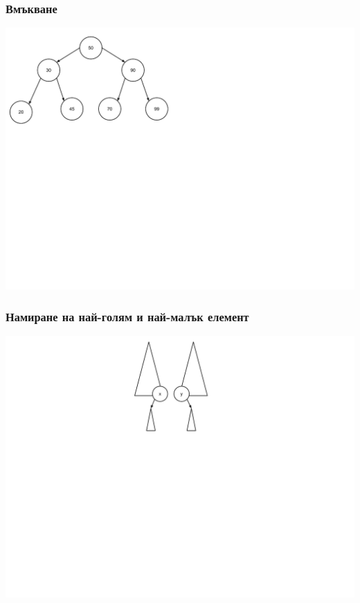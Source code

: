 \documentclass{beamer}
\begin{document}
\begin{frame}[fragile]
\frametitle{Вмъкване}

\includegraphics[width=14cm]{images/tree_bot_clean}

\end{frame}


\begin{frame}[fragile]
\frametitle{Намиране на най-голям и най-малък елемент}

\includegraphics[width=14cm]{images/tree_extremums}

\end{frame}
\end{document}
